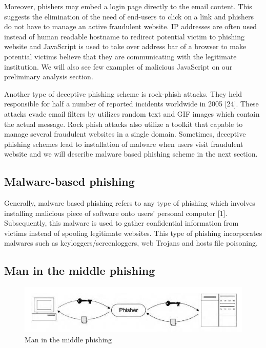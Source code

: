 Moreover, phishers may embed a login page directly to the email content.
This suggests the elimination of the need of end-users to click on
a link and phishers do not have to manage an active fraudulent website.
IP addresses are often used instead of human readable hostname to
redirect potential victim to phishing website and JavaScript is used
to take over address bar of a browser to make potential victims believe
that they are communicating with the legitimate institution. We will
also see few examples of malicious JavaScript on our preliminary analysis
section. 

Another type of deceptive phishing scheme is rock-phish attacks. They
held responsible for half a number of reported incidents worldwide
in 2005 {[}24{]}. These attacks evade email filters by utilizes random
text and GIF images which contain the actual message. Rock phish attacks
also utilize a toolkit that capable to manage several fraudulent websites
in a single domain. Sometimes, deceptive phishing schemes lead to
installation of malware when users visit fraudulent website and we
will describe malware based phishing scheme in the next section. 


\subsection{Malware-based phishing}

Generally, malware based phishing refers to any type of phishing which
involves installing malicious piece of software onto users' personal
computer {[}1{]}. Subsequently, this malware is used to gather confidential
information from victims instead of spoofing legitimate websites.
This type of phishing incorporates malwares such as keyloggers/screenloggers,
web Trojans and hosts file poisoning.


\subsection{Man in the middle phishing}

\begin{figure}


\centering{}\includegraphics[scale=0.4]{gfx/jakobsson}\protect\caption{\label{fig:jakobsson}Man in the middle phishing\citep{jakobsson:2006}}
\end{figure}


